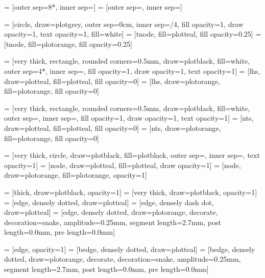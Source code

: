 
 = [outer sep=8*\nodespacing, inner sep=\nodesize]
 = [outer sep=\nodespacing, inner sep=\nodesize]

 = [circle, draw=plotgrey, outer sep=0cm, inner sep=\nodesize/4, fill opacity=1, draw opacity=1, text opacity=1, fill=white]
 = [tnode, fill=plotteal, fill opacity=0.25]
 = [tnode, fill=plotorange, fill opacity=0.25]

 = [very thick, rectangle, rounded corners=0.5mm, draw=plotblack, fill=white, outer sep=4*\nodespacing, inner sep=\nodesize,  fill opacity=1, draw opacity=1, text opacity=1]
 = [lhs, draw=plotteal, fill=plotteal, fill opacity=0]
 = [lhs, draw=plotorange, fill=plotorange, fill opacity=0]

 = [very thick, rectangle, rounded corners=0.5mm, draw=plotblack, fill=white, outer sep=\nodespacing, inner sep=\nodesize, fill opacity=1, draw opacity=1, text opacity=1]
 = [nts, draw=plotteal, fill=plotteal, fill opacity=0]
 = [nts, draw=plotorange, fill=plotorange, fill opacity=0]

 = [very thick, circle, draw=plotblack, fill=plotblack, outer sep=\nodespacing, inner sep=\nodesize, text opacity=1]  %
 = [node, draw=plotteal, fill=plotteal, draw opacity=1]
 = [node, draw=plotorange, fill=plotorange, opacity=1]

 = [thick, draw=plotblack, opacity=1]
 = [very thick, draw=plotblack, opacity=1]
 = [edge, densely dotted, draw=plotteal]
 = [edge, densely dash dot, draw=plotteal]
 = [edge, densely dotted, draw=plotorange, decorate, decoration={snake, amplitude=0.25mm, segment length=2.7mm, post length=0.0mm, pre length=0.0mm}]

 = [edge, opacity=1]
 = [bedge, densely dotted, draw=plotteal]
 = [bedge, densely dotted, draw=plotorange, decorate, decoration={snake, amplitude=0.25mm, segment length=2.7mm, post length=0.0mm, pre length=0.0mm}]

